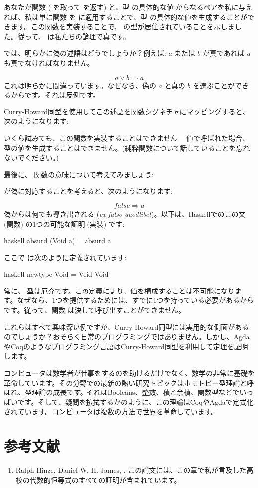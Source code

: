 あなたが関数  ( を取って  を返す) と、型  の具体的な値  からなるペアを私に与えれば、私は単に関数  を  に適用することで、型  の具体的な値を生成することができます。この関数を実装することで、 の型が居住されていることを示しました。従って、 は私たちの論理で真です。

では、明らかに偽の述語はどうでしょうか？例えば: $a$ または $b$ が真であれば $a$ も真でなければなりません。

\[a \vee b \Rightarrow a\]
これは明らかに間違っています。なぜなら、偽の $a$ と真の $b$ を選ぶことができるからです。それは反例です。

Curry-Howard同型を使用してこの述語を関数シグネチャにマッピングすると、次のようになります: 

いくら試みても、この関数を実装することはできません--- 値で呼ばれた場合、 型の値を生成することはできません。(純粋関数について話していることを忘れないでください。) 

最後に、 関数の意味について考えてみましょう: 

 が偽に対応することを考えると、次のようになります: 

\[\mathit{false} \Rightarrow a\]
偽からは何でも導き出される (\emph{ex falso quodlibet})。以下は、Haskellでのこの文 (関数) の1つの可能な証明 (実装) です: 

\begin{snip}{haskell}
absurd (Void a) = absurd a
\end{snip}
ここで  は次のように定義されています: 

\begin{snip}{haskell}
newtype Void = Void Void
\end{snip}
常に、 型は厄介です。この定義により、値を構成することは不可能になります。なぜなら、1つを提供するためには、すでに1つを持っている必要があるからです。従って、関数  は決して呼び出すことができません。

これらはすべて興味深い例ですが、Curry-Howard同型には実用的な側面があるのでしょうか？おそらく日常のプログラミングではありません。しかし、AgdaやCoqのようなプログラミング言語はCurry-Howard同型を利用して定理を証明します。

コンピュータは数学者が仕事をするのを助けるだけでなく、数学の非常に基礎を革命しています。その分野での最新の熱い研究トピックはホモトピー型理論と呼ばれ、型理論の成長です。それはBooleans、整数、積と余積、関数型などでいっぱいです。そして、疑問を払拭するかのように、この理論はCoqやAgdaで定式化されています。コンピュータは複数の方法で世界を革命しています。

\section{参考文献}

\begin{enumerate}
  \tightlist
  \item
        Ralph Hinze, Daniel W. H. James,
        . この論文には、この章で私が言及した高校の代数的恒等式のすべての証明が含まれています。
\end{enumerate}
